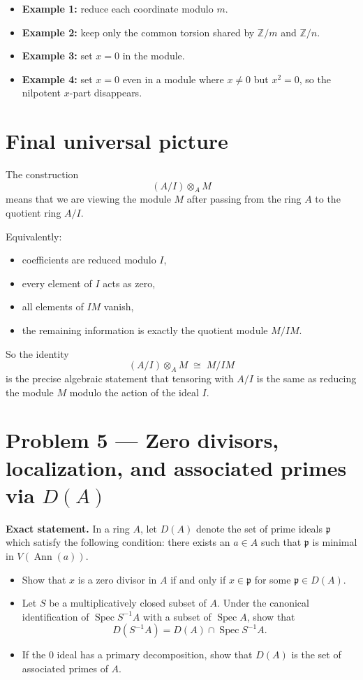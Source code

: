 \documentclass[12pt,a4paper]{article}
\theoremstyle{plain}
\theoremstyle{definition}      %
\begin{document}
	\begin{itemize}
		\item \textbf{Example 1:} reduce each coordinate modulo \(m\).
		\item \textbf{Example 2:} keep only the common torsion shared by \(\mathbb Z/m\) and \(\mathbb Z/n\).
		\item \textbf{Example 3:} set \(x=0\) in the module.
		\item \textbf{Example 4:} set \(x=0\) even in a module where \(x\neq 0\) but \(x^2=0\), so the nilpotent \(x\)-part disappears.
	\end{itemize}
	
	\section{Final universal picture}
	
	The construction
	\[
	(A/I)\otimes_A M
	\]
	means that we are viewing the module \(M\) after passing from the ring \(A\) to the quotient ring \(A/I\).
	
	Equivalently:
	\begin{itemize}
		\item coefficients are reduced modulo \(I\),
		\item every element of \(I\) acts as zero,
		\item all elements of \(IM\) vanish,
		\item the remaining information is exactly the quotient module \(M/IM\).
	\end{itemize}
	
	So the identity
	\[
	(A/I)\otimes_A M \;\cong\; M/IM
	\]
	is the precise algebraic statement that tensoring with \(A/I\) is the same as reducing the module \(M\) modulo the action of the ideal \(I\).
	
	
	\section*{Problem 5 --- Zero divisors, localization, and associated primes via \(D(A)\)}
	
	\textbf{Exact statement.}
	In a ring \(A\), let \(D(A)\) denote the set of prime ideals \(\mathfrak p\) which satisfy the following condition: there exists an \(a\in A\) such that \(\mathfrak p\) is minimal in \(V(\operatorname{Ann}(a))\).
	
	\begin{itemize}
		\item[(a)] Show that \(x\) is a zero divisor in \(A\) if and only if \(x\in \mathfrak p\) for some \(\mathfrak p\in D(A)\).
		\item[(b)] Let \(S\) be a multiplicatively closed subset of \(A\). Under the canonical identification of \(\operatorname{Spec} S^{-1}A\) with a subset of \(\operatorname{Spec} A\), show that
		\[
		D(S^{-1}A)=D(A)\cap \operatorname{Spec} S^{-1}A.
		\]
		\item[(c)] If the \(0\) ideal has a primary decomposition, show that \(D(A)\) is the set of associated primes of \(A\).
	\end{itemize}
	
\end{document}
